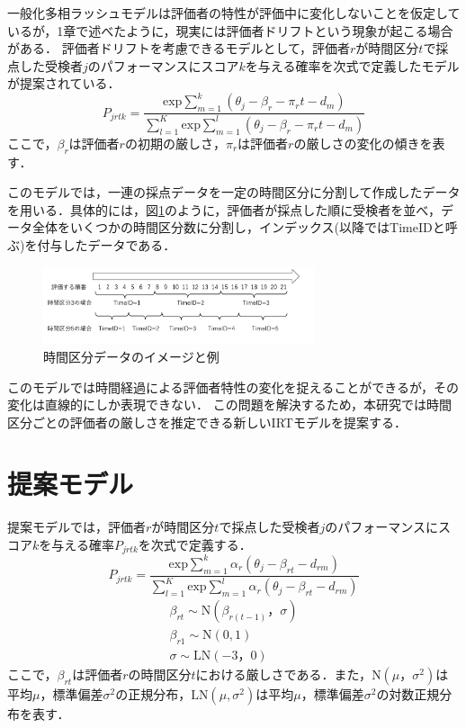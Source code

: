 \documentclass[dvipdfmx, twocolumn, a4paper]{hcresume}
\begin{document}
一般化多相ラッシュモデルは評価者の特性が評価中に変化しないことを仮定しているが，1章で述べたように，現実には評価者ドリフトという現象が起こる場合がある．
評価者ドリフトを考慮できるモデルとして，評価者$r$が時間区分$t$で採点した受検者$j$のパフォーマンスにスコア$k$を与える確率を次式で定義したモデルが提案されている．
\begin{equation}
  P_{jrtk}=\frac{\mathrm{exp}\sum_{m=1}^{k}(\theta_{j}-\beta_{r} - \pi_{r}t-d_{m})}{\sum_{l=1}^{K}\mathrm{exp}\sum_{m=1}^{l}(\theta_{j}-\beta_{r} - \pi_{r}t-d_{m})}
\end{equation}
ここで，$\beta_{r}$は評価者$r$の初期の厳しさ，$\pi_{r}$は評価者$r$の厳しさの変化の傾きを表す．

このモデルでは，一連の採点データを一定の時間区分に分割して作成したデータを用いる．具体的には，図\ref{timeid}のように，評価者が採点した順に受検者を並べ，データ全体をいくつかの時間区分数に分割し，インデックス(以降ではTimeIDと呼ぶ)を付与したデータである．

\begin{figure}[t]
  \centering
  \includegraphics[width=8cm]{img/timeid.png}
  \caption{時間区分データのイメージと例}
  \label{timeid}
\end{figure}

このモデルでは時間経過による評価者特性の変化を捉えることができるが，その変化は直線的にしか表現できない．
この問題を解決するため，本研究では時間区分ごとの評価者の厳しさを推定できる新しいIRTモデルを提案する．
\section{提案モデル}
提案モデルでは，評価者$r$が時間区分$t$で採点した受検者$j$のパフォーマンスにスコア$k$を与える確率$P_{jrtk}$を次式で定義する．
\begin{equation}
  P_{jrtk}=\frac{\mathrm{exp}\sum^k_{m=1}{\alpha_r(\theta_{j}-\beta_{rt}-d_{rm})}}{\sum^K_{l=1} \mathrm{exp}\sum^l_{m=1}{\alpha_r(\theta_{j}-\beta_{rt}-d_{rm})}}
\end{equation}
\vspace{-5mm}
{\small
\begin{eqnarray}
  \beta_{rt}\sim \mathrm{N}(\beta_{r(t-1)}，\sigma)\nonumber\\
  \beta_{r1} \sim \mathrm{N}(0,1)\nonumber\\
  \sigma \sim \mathrm{LN}(-3，0)\nonumber
\end{eqnarray}
}
ここで，$\beta_{rt}$は評価者$r$の時間区分$t$における厳しさである．また，$\mathrm{N}(\mu，\sigma^2)$は平均$\mu$，標準偏差$\sigma^2$の正規分布，$\mathrm{LN}(\mu,\sigma^2)$は平均$\mu$，標準偏差$\sigma^2$の対数正規分布を表す．
\end{document}
